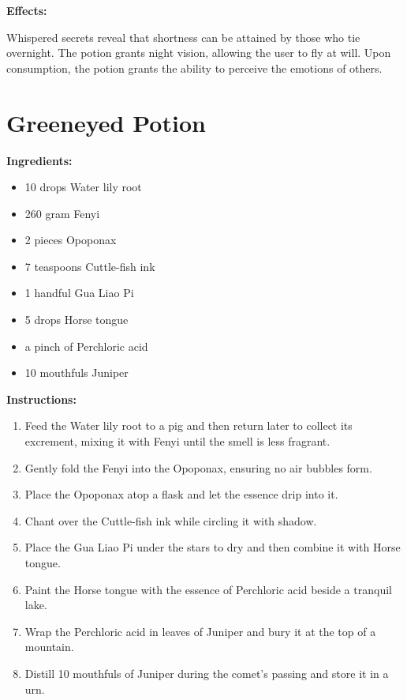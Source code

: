 \documentclass{article}
\begin{document}
\textbf{Effects:}

Whispered secrets reveal that shortness can be attained by those who tie overnight. The potion grants night vision, allowing the user to fly at will. Upon consumption, the potion grants the ability to perceive the emotions of others.

\newpage
\section*{Greeneyed Potion}

\textbf{Ingredients:}

\begin{itemize}
  \item 10 drops Water lily root
  \item 260 gram Fenyi
  \item 2 pieces Opoponax
  \item 7 teaspoons Cuttle-fish ink
  \item 1 handful Gua Liao Pi
  \item 5 drops Horse tongue
  \item a pinch of Perchloric acid
  \item 10 mouthfuls Juniper
\end{itemize}

\textbf{Instructions:}

\begin{enumerate}
  \item Feed the Water lily root to a pig and then return later to collect its excrement, mixing it with Fenyi until the smell is less fragrant.
  \item Gently fold the Fenyi into the Opoponax, ensuring no air bubbles form.
  \item Place the Opoponax atop a flask and let the essence drip into it.
  \item Chant over the Cuttle-fish ink while circling it with shadow.
  \item Place the Gua Liao Pi under the stars to dry and then combine it with Horse tongue.
  \item Paint the Horse tongue with the essence of Perchloric acid beside a tranquil lake.
  \item Wrap the Perchloric acid in leaves of Juniper and bury it at the top of a mountain.
  \item Distill 10 mouthfuls of Juniper during the comet’s passing and store it in a urn.
\end{enumerate}
\end{document}
